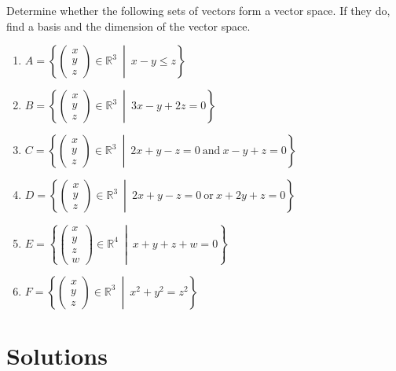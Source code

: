 \begin{question}
Determine whether the following sets of vectors form a vector space. If they do, find a basis and the dimension of the vector space.
\end{question}
\begin{enumerate}[label=\alph*)]
    \item $A = \left\{
    \begin{pmatrix}x\\y\\z\end{pmatrix} \in \mathbb{R}^3 \ \middle| \ x - y \le z
    \right\}$
    \item $B = \left\{
    \begin{pmatrix}x\\y\\z\end{pmatrix} \in \mathbb{R}^3 \ \middle| \ 3x - y + 2z = 0
    \right\}$
    \item $C = \left\{
    \begin{pmatrix}x\\y\\z\end{pmatrix} \in \mathbb{R}^3 \ \middle| \ 2x + y - z = 0 \ \text{and} \ x - y + z = 0
    \right\}$
    \item $D = \left\{
    \begin{pmatrix}x\\y\\z\end{pmatrix} \in \mathbb{R}^3 \ \middle| \ 2x + y - z = 0 \ \text{or} \ x + 2y + z = 0
    \right\}$
    \item $E = \left\{
    \begin{pmatrix}x\\y\\z\\w\end{pmatrix} \in \mathbb{R}^4 \ \middle| \ x + y + z + w = 0
    \right\}$
    \item $F = \left\{
    \begin{pmatrix}x\\y\\z\end{pmatrix} \in \mathbb{R}^3 \ \middle| \ x^2 + y^2 = z^2
    \right\}$
\end{enumerate}

\newpage

\section{Solutions}
